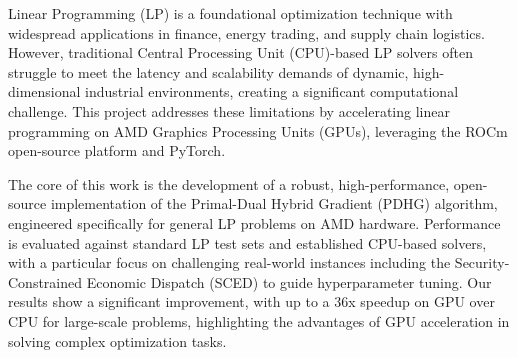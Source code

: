 \documentclass[twoside,12pt,openright]{report}  %
\begin{document}
Linear Programming (LP) is a foundational optimization technique with widespread applications in finance, energy trading, and supply chain logistics. However, traditional Central Processing Unit (CPU)-based LP solvers often struggle to meet the latency and scalability demands of dynamic, high-dimensional industrial environments, creating a significant computational challenge. This project addresses these limitations by accelerating linear programming on AMD Graphics Processing Units (GPUs), leveraging the ROCm open-source platform and PyTorch.

The core of this work is the development of a robust, high-performance, open-source implementation of the Primal-Dual Hybrid Gradient (PDHG) algorithm, engineered specifically for general LP problems on AMD hardware. Performance is evaluated against standard LP test sets and established CPU-based solvers, with a particular focus on challenging real-world instances including the Security-Constrained Economic Dispatch (SCED) to guide hyperparameter tuning. Our results show a significant improvement, with up to a 36x speedup on GPU over CPU for large-scale problems, highlighting the advantages of GPU acceleration in solving complex optimization tasks.

\vspace{24pt}

\end{document}
